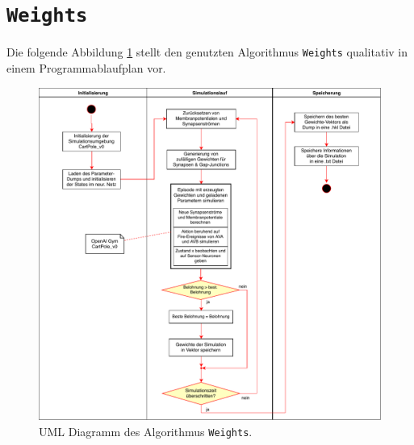 	\section{\texttt{Weights}}
	\label{app:UML_RS}
	Die folgende Abbildung \ref{fig:uml_weights} stellt den genutzten Algorithmus \texttt{Weights} qualitativ in einem Programmablaufplan vor.
	\begin{figure}[H]
		\centering
		\includegraphics[width=14cm]{figures/appendix/uml_w.pdf}
		\caption{UML Diagramm des Algorithmus \texttt{Weights}.}
		\label{fig:uml_weights}
	\end{figure}

%
